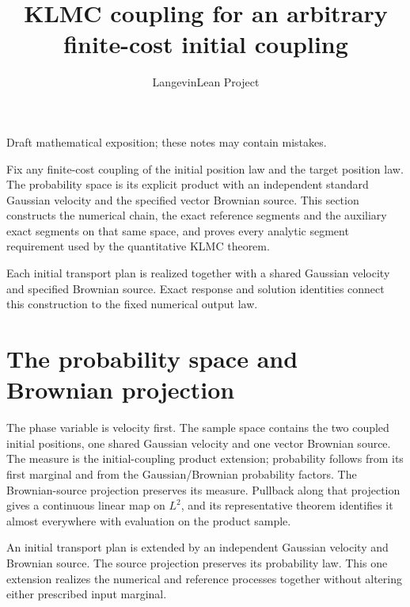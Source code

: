 \documentclass[11pt,a4paper]{article}
\title{\texorpdfstring{KLMC coupling for an arbitrary finite-cost initial coupling}{KLMC coupling for an arbitrary finite-cost initial coupling}}
\author{LangevinLean Project}
\date{}
\begin{document}
\maketitle
Draft mathematical exposition; these notes may contain mistakes.


Fix any finite-cost coupling of the initial position law and the target position law. The probability space is its explicit product with an independent standard Gaussian velocity and the specified vector Brownian source. This section constructs the numerical chain, the exact reference segments and the auxiliary exact segments on that same space, and proves every analytic segment requirement used by the quantitative KLMC theorem.



Each initial transport plan is realized together with a shared Gaussian velocity and specified Brownian source. Exact response and solution identities connect this construction to the fixed numerical output law.


\section{\texorpdfstring{The probability space and Brownian projection}{The probability space and Brownian projection}}


The phase variable is velocity first. The sample space contains the two coupled initial positions, one shared Gaussian velocity and one vector Brownian source. The measure is the initial-coupling product extension; probability follows from its first marginal and from the Gaussian/\allowbreak{}Brownian probability factors. The Brownian-source projection preserves its measure. Pullback along that projection gives a continuous linear map on \(L^{2}\), and its representative theorem identifies it almost everywhere with evaluation on the product sample.



An initial transport plan is extended by an independent Gaussian velocity and Brownian source. The source projection preserves its probability law. This one extension realizes the numerical and reference processes together without altering either prescribed input marginal.
\end{document}
